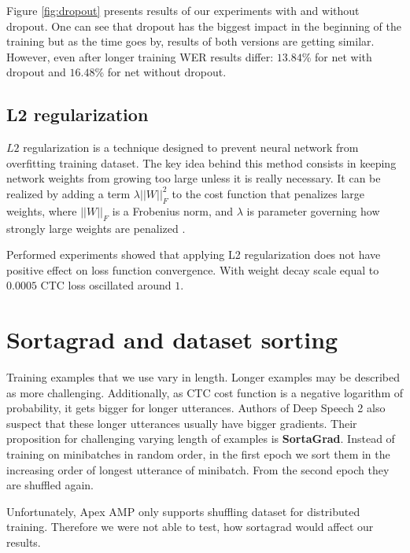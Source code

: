 \documentclass[licencjacka,en]{pracamgr}
\begin{document}
	Figure \ref{fig:dropout} presents results of our experiments with and without dropout. One can see that dropout has the biggest impact in the beginning of the training but as the time goes by, results of both versions are getting similar. However, even after longer training WER results differ: $13.84$\% for net with dropout and $16.48$\% for net without dropout.
	
	
	\subsection{L2 regularization}
	$L2$ regularization is a technique designed to prevent neural network from overfitting training dataset. The key idea behind this method consists in keeping network weights from growing too large unless it is really necessary. It can be realized by adding a term $\lambda ||W||^2_F $ to the cost function that penalizes large weights, where $||W||_F $ is
	a Frobenius norm, and $\lambda$ is parameter governing how strongly large weights are penalized \cite{L2}.
	
	Performed experiments showed that applying L2 regularization does not have positive effect on loss function convergence. With weight decay scale equal to $0.0005$ CTC loss oscillated around $1$.
	
	
	
	
	
	
	\section{Sortagrad and dataset sorting}
	Training examples that we use vary in length. Longer examples may be described as more challenging. Additionally, as CTC cost function is a negative logarithm of probability, it gets bigger for longer utterances. Authors of Deep Speech 2 also suspect that these longer utterances usually have bigger gradients. Their proposition for challenging varying length of examples is \textbf{SortaGrad}. Instead of training on minibatches in random order, in the first epoch we sort them in the increasing order of longest utterance of minibatch. From the second epoch they are shuffled again.
	
	Unfortunately, Apex AMP only supports shuffling dataset for distributed training. Therefore we were not able to test, how sortagrad would affect our results.
	
\end{document}
